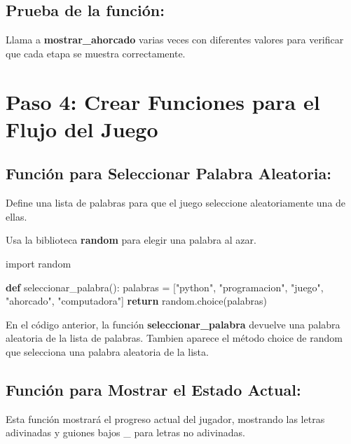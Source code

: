 \documentclass[
  a4paper,
  DIV=11,
  numbers=noendperiod,
  onepage,
  openany]{scrreprt}
\newenvironment{Shaded}{\begin{snugshade}}{\end{snugshade}}
\newcommand{\ControlFlowTok}[1]{\textcolor[rgb]{0.00,0.23,0.31}{\textbf{#1}}}
\newcommand{\ImportTok}[1]{\textcolor[rgb]{0.00,0.46,0.62}{#1}}
\newcommand{\KeywordTok}[1]{\textcolor[rgb]{0.00,0.23,0.31}{\textbf{#1}}}
\newcommand{\NormalTok}[1]{\textcolor[rgb]{0.00,0.23,0.31}{#1}}
\newcommand{\OperatorTok}[1]{\textcolor[rgb]{0.37,0.37,0.37}{#1}}
\newcommand{\StringTok}[1]{\textcolor[rgb]{0.13,0.47,0.30}{#1}}
\begin{document}
\subsection{Prueba de la función:}\label{prueba-de-la-funciuxf3n}

Llama a \textbf{mostrar\_ahorcado} varias veces con diferentes valores
para verificar que cada etapa se muestra correctamente.

\section{Paso 4: Crear Funciones para el Flujo del
Juego}\label{paso-4-crear-funciones-para-el-flujo-del-juego}

\subsection{Función para Seleccionar Palabra
Aleatoria:}\label{funciuxf3n-para-seleccionar-palabra-aleatoria}

Define una lista de palabras para que el juego seleccione aleatoriamente
una de ellas.

Usa la biblioteca \textbf{random} para elegir una palabra al azar.

\begin{Shaded}
\begin{Highlighting}[]
\ImportTok{import}\NormalTok{ random}

\KeywordTok{def}\NormalTok{ seleccionar\_palabra():}
\NormalTok{    palabras }\OperatorTok{=}\NormalTok{ [}\StringTok{"python"}\NormalTok{, }\StringTok{"programacion"}\NormalTok{, }\StringTok{"juego"}\NormalTok{, }\StringTok{"ahorcado"}\NormalTok{, }\StringTok{"computadora"}\NormalTok{]}
    \ControlFlowTok{return}\NormalTok{ random.choice(palabras)}
\end{Highlighting}
\end{Shaded}

En el código anterior, la función \textbf{seleccionar\_palabra} devuelve
una palabra aleatoria de la lista de palabras. Tambien aparece el método
choice de random que selecciona una palabra aleatoria de la lista.

\subsection{Función para Mostrar el Estado
Actual:}\label{funciuxf3n-para-mostrar-el-estado-actual}

Esta función mostrará el progreso actual del jugador, mostrando las
letras adivinadas y guiones bajos \_ para letras no adivinadas.
\end{document}
